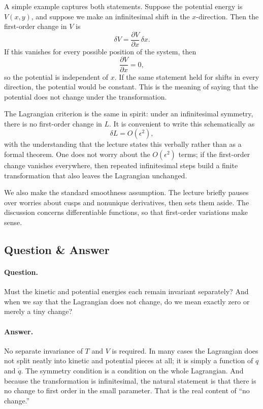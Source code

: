 A simple example captures both statements. Suppose the potential energy is \(V(x,y)\), and suppose we make an infinitesimal shift in the \(x\)-direction. Then the first-order change in \(V\) is
\begin{equation}
\delta V=\frac{\partial V}{\partial x}\,\delta x.
\end{equation}
If this vanishes for every possible position of the system, then
\begin{equation}
\frac{\partial V}{\partial x}=0,
\end{equation}
so the potential is independent of \(x\). If the same statement held for shifts in every direction, the potential would be constant. This is the meaning of saying that the potential does not change under the transformation.

The Lagrangian criterion is the same in spirit: under an infinitesimal symmetry, there is no first-order change in \(L\). It is convenient to write this schematically as
\begin{equation}
\delta L = O(\epsilon^2),
\end{equation}
with the understanding that the lecture states this verbally rather than as a formal theorem. One does not worry about the \(O(\epsilon^2)\) terms; if the first-order change vanishes everywhere, then repeated infinitesimal steps build a finite transformation that also leaves the Lagrangian unchanged.

We also make the standard smoothness assumption. The lecture briefly pauses over worries about cusps and nonunique derivatives, then sets them aside. The discussion concerns differentiable functions, so that first-order variations make sense.

\subsection{Question \& Answer}

\paragraph{Question.} Must the kinetic and potential energies each remain invariant separately? And when we say that the Lagrangian does not change, do we mean exactly zero or merely a tiny change?

\paragraph{Answer.} No separate invariance of \(T\) and \(V\) is required. In many cases the Lagrangian does not split neatly into kinetic and potential pieces at all; it is simply a function of \(q\) and \(\dot q\). The symmetry condition is a condition on the whole Lagrangian. And because the transformation is infinitesimal, the natural statement is that there is no change to first order in the small parameter. That is the real content of ``no change.''

